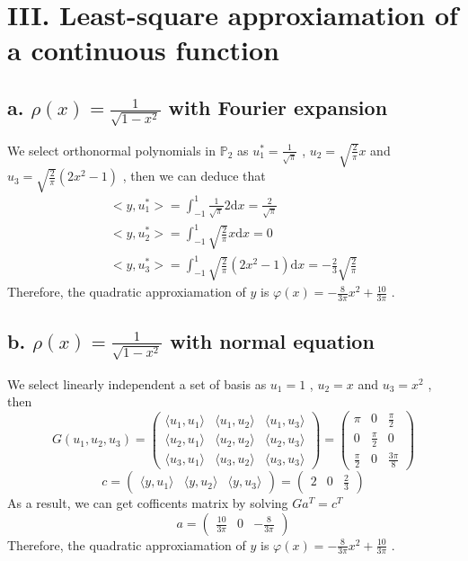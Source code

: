 \documentclass[twoside,a4paper]{article}
\newcommand{\dif}{\mathrm{d}}
\begin{document}
\section*{III. Least-square approxiamation of a continuous function}
\subsection*{a. $\rho(x)=\frac{1}{\sqrt{1-x^2}}$ with Fourier expansion}
We select orthonormal polynomials in $\mathbb{P}_2$ as $u_1^*=\frac{1}{\sqrt{\pi}}$ , $u_2=\sqrt{\frac{2}{\pi}}x$ and $u_3=\sqrt{\frac{2}{\pi}}(2x^2-1)$ , then we can deduce that
\begin{gather}
<y,u_1^*>=\int_{-1}^1 \frac{1}{\sqrt{\pi}}2 \dif x = \frac{2}{\sqrt{\pi}} \\
<y,u_2^*>=\int_{-1}^1 \sqrt{\frac{2}{\pi}}x \dif x = 0 \\
<y,u_3^*>=\int_{-1}^1 \sqrt{\frac{2}{\pi}}(2x^2-1) \dif x= -\frac{2}{3}\sqrt{\frac{2}{\pi}}
\end{gather}
Therefore, the quadratic approxiamation of $y$ is $\varphi(x)=-\frac{8}{3\pi}x^2+\frac{10}{3\pi}$ .
\subsection*{b. $\rho(x)=\frac{1}{\sqrt{1-x^2}}$ with normal equation}
We select linearly independent a set of basis as $u_1=1$ , $u_2=x$ and $u_3=x^2$ , then
\[
G(u_1,u_2,u_3)= 
\begin{pmatrix}
\langle u_1,u_1 \rangle & \langle u_1,u_2 \rangle & \langle u_1,u_3 \rangle \\
\langle u_2,u_1 \rangle & \langle u_2,u_2 \rangle & \langle u_2,u_3 \rangle \\
\langle u_3,u_1 \rangle & \langle u_3,u_2 \rangle & \langle u_3,u_3 \rangle 
\end{pmatrix} =
\begin{pmatrix}
\pi & 0 & \frac{\pi}{2} \\
0 & \frac{\pi}{2} & 0 \\
\frac{\pi}{2} & 0 & \frac{3\pi}{8}
\end{pmatrix}
\]
\[
c =
\begin{pmatrix}
\langle y,u_1 \rangle & \langle y,u_2 \rangle & \langle y,u_3 \rangle 
\end{pmatrix}=
\begin{pmatrix}
2 & 0 & \frac{2}{3}
\end{pmatrix}
\]
As a result, we can get cofficents matrix by solving $Ga^T=c^T$ 
\[
a =
\begin{pmatrix}
\frac{10}{3\pi} & 0 & -\frac{8}{3\pi}
\end{pmatrix}
\]
Therefore, the quadratic approxiamation of $y$ is $\varphi(x)=-\frac{8}{3\pi}x^2+\frac{10}{3\pi}$ .
\end{document}
